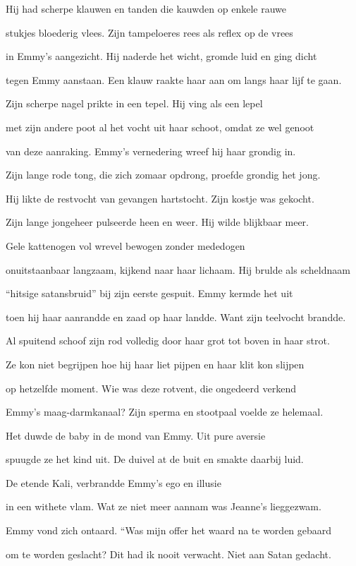 Hij had scherpe klauwen
en tanden die kauwden
op enkele rauwe

stukjes bloederig vlees.
Zijn tampeloeres rees
als reflex op de vrees

in Emmy’s aangezicht.
Hij naderde het wicht,
gromde luid en ging dicht

tegen Emmy aanstaan.
Een klauw raakte haar aan
om langs haar lijf te gaan.

Zijn scherpe nagel
prikte in een tepel.
Hij ving als een lepel

met zijn andere poot
al het vocht uit haar schoot,
omdat ze wel genoot

van deze aanraking.
Emmy’s vernedering
wreef hij haar grondig in.

Zijn lange rode tong,
die zich zomaar opdrong,
proefde grondig het jong.

Hij likte de restvocht
van gevangen hartstocht.
Zijn kostje was gekocht.

Zijn lange jongeheer
pulseerde heen en weer.
Hij wilde blijkbaar meer.

Gele kattenogen
vol wrevel bewogen
zonder mededogen

onuitstaanbaar langzaam,
kijkend naar haar lichaam.
Hij brulde als scheldnaam

“hitsige satansbruid”
bij zijn eerste gespuit.
Emmy kermde het uit

toen hij haar aanrandde
en zaad op haar landde.
Want zijn teelvocht brandde.

Al spuitend schoof zijn rod
volledig door haar grot
tot boven in haar strot.

Ze kon niet begrijpen
hoe hij haar liet pijpen
en haar klit kon slijpen

op hetzelfde moment.
Wie was deze rotvent,
die ongedeerd verkend

Emmy’s maag-darmkanaal?
Zijn sperma en stootpaal
voelde ze helemaal.

Het duwde de baby
in de mond van Emmy.
Uit pure aversie

spuugde ze het kind uit.
De duivel at de buit
en smakte daarbij luid.

De etende Kali,
verbrandde Emmy’s
ego en illusie

in een withete vlam.
Wat ze niet meer aannam
was Jeanne’s lieggezwam.

Emmy vond zich ontaard.
“Was mijn offer het waard
na te worden gebaard

om te worden geslacht?
Dit had ik nooit verwacht.
Niet aan Satan gedacht.

